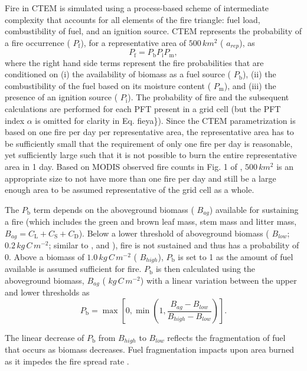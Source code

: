 Fire in C\+T\+E\+M is simulated using a process-\/based scheme of intermediate complexity that accounts for all elements of the fire triangle\+: fuel load, combustibility of fuel, and an ignition source. C\+T\+E\+M represents the probability of a fire occurrence ( $P_\mathrm{f}$), for a representative area of $500\,km^2$ ( $a_{rep}$), as \[ \label{fieya} P_\mathrm{f} = P_\mathrm{b}P_\mathrm{i}P_\mathrm{m},\] where the right hand side terms represent the fire probabilities that are conditioned on (i) the availability of biomass as a fuel source ( $P_\mathrm{b}$), (ii) the combustibility of the fuel based on its moisture content ( $P_\mathrm{m}$), and (iii) the presence of an ignition source ( $P_\mathrm{i}$). The probability of fire and the subsequent calculations are performed for each P\+F\+T present in a grid cell (but the P\+F\+T index $\alpha$ is omitted for clarity in Eq. fieya\}). Since the C\+T\+E\+M parametrization is based on one fire per day per representative area, the representative area has to be sufficiently small that the requirement of only one fire per day is reasonable, yet sufficiently large such that it is not possible to burn the entire representative area in 1 day. Based on M\+O\+D\+I\+S observed fire counts in Fig. 1 of \cite{Li20121c2}, $500\,km^2$ is an appropriate size to not have more than one fire per day and still be a large enough area to be assumed representative of the grid cell as a whole.

The $P_\mathrm{b}$ term depends on the aboveground biomass ( $B_{ag}$) available for sustaining a fire (which includes the green and brown leaf mass, stem mass and litter mass, $B_{ag} = C_\mathrm{L} + C_\mathrm{S} + C_\mathrm{D}$). Below a lower threshold of aboveground biomass ( $B_{low}$; $0.2\, kg\,C\,m^{-2}$; similar to \cite{Moorcroft2001-co}, and \cite{Kucharik2000-xk}), fire is not sustained and thus has a probability of 0. Above a biomass of $1.0\, kg\,C\,m^{-2}$ ( $B_{high}$), $P_\mathrm{b}$ is set to 1 as the amount of fuel available is assumed sufficient for fire. $P_\mathrm{b}$ is then calculated using the aboveground biomass, $B_{ag}$ ( $kg\,C\,m^{-2}$) with a linear variation between the upper and lower thresholds as \[ \label{eqn:Pb} P_\mathrm{b}=\max\left[0, \min\left(1,\frac{B_{ag}-B_{low}}{B_{high} - B_{low}}\right)\right]. \]

The linear decrease of $P_\mathrm{b}$ from $B_{high}$ to $B_{low}$ reflects the fragmentation of fuel that occurs as biomass decreases. Fuel fragmentation impacts upon area burned as it impedes the fire spread rate \cite{Guyette2002-rc}.


